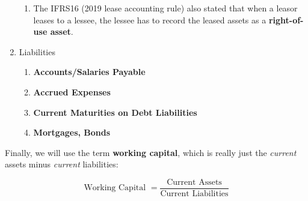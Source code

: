 \documentclass{article}
\begin{document}
\begin{enumerate}
\begin{enumerate}
\item The IFRS16 (2019 lease accounting rule) also stated that when a leasor leases to a lessee, the lessee has to record the leased assets as a \textbf{right-of-use asset}.
\end{enumerate}
\item
Liabilities
\begin{enumerate}
\item \textbf{Accounts/Salaries Payable}
\item \textbf{Accrued Expenses}
\item \textbf{Current Maturities on Debt Liabilities}
\item \textbf{Mortgages, Bonds}
\end{enumerate}
\end{enumerate}
Finally, we will use the term \textbf{working capital}, which is really just the \textit{current} assets minus \textit{current} liabilities:

\begin{equation}
  \text{Working Capital } = \frac{\text{Current Assets}}{\text{Current Liabilities}}
\end{equation}
\end{document}
